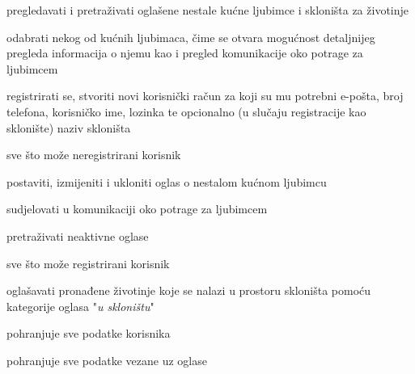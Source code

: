 			
			\begin{packed_enum}
				\item  {}
				
				\begin{packed_enum}
					
					\item pregledavati i pretraživati oglašene nestale kućne ljubimce i skloništa za životinje
					\item odabrati nekog od kućnih ljubimaca, čime se otvara mogućnost detaljnijeg pregleda informacija o njemu kao i pregled komunikacije oko potrage za ljubimcem
					\item registrirati se, stvoriti novi korisnički račun za koji su mu potrebni e-pošta, broj telefona, korisničko ime, lozinka te opcionalno (u slučaju registracije kao sklonište) naziv skloništa
					
				\end{packed_enum}
			
				\item  {}
				
				\begin{packed_enum}
					
					\item sve što može neregistrirani korisnik
					\item postaviti, izmijeniti i ukloniti oglas o nestalom kućnom ljubimcu
					\item sudjelovati u komunikaciji oko potrage za ljubimcem
					\item pretraživati neaktivne oglase
					
				\end{packed_enum}
			
			\item  {}
				
				\begin{packed_enum}
				
					\item sve što može registrirani korisnik
					\item oglašavati pronađene životinje koje se nalazi u prostoru skloništa pomoću kategorije oglasa "\textit{u skloništu}"
					
				\end{packed_enum}
			
			\item  {}
				
				\begin{packed_enum}
					
					\item pohranjuje sve podatke korisnika
					\item pohranjuje sve podatke vezane uz oglase
					
				\end{packed_enum}
			\end{packed_enum}
			
